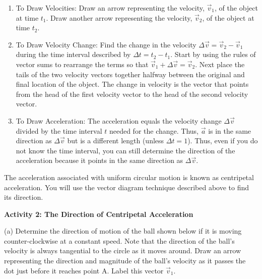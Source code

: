 \begin{enumerate}
\item To Draw Velocities: Draw an arrow representing the velocity, \( 
{\vec v}_{1} \), of
the object at time \( t_{1} \). Draw another arrow representing the velocity,
\( {\vec v}_{2} \), of the object at time \( t_{2} \). 
\item To Draw Velocity Change: Find the change in the velocity 
\( \Delta  {\vec v}
= {\vec v}_{2}  - {\vec v}_{1} \) during the time interval described
by \( \Delta  t = t_{2}  - t_{1} \). Start by using the rules of
vector sums to rearrange the terms so that \({\vec v}_{1}  +  \Delta  
{\vec v}
= {\vec v}_{2} \). Next place the tails of the two velocity vectors together
halfway between the original and final location of the object. The change in
velocity is the vector that points from the head of the first velocity vector
to the head of the second velocity vector. 
\item To Draw Acceleration: The acceleration equals the velocity change 
\( \Delta  {\vec v}\)
divided by the time interval $t$ needed for the change. Thus, $\vec a$ is in
the same direction as \( \Delta  {\vec v}\) but is a different length (unless
\( \Delta  t = 1\)). Thus, even if you do not know the time interval, you
can still determine the direction of the acceleration because it points in the
same direction as \( \Delta  {\vec v}\). 
\end{enumerate}
The acceleration associated with uniform circular motion is known as centripetal
acceleration. You will use the vector diagram technique described above to find
its direction. 

\textbf{Activity 2: The Direction of Centripetal Acceleration }

(a) Determine the direction of motion of the ball shown below if it is moving
counter-clockwise at a constant speed. Note that the direction of the ball's
velocity is always tangential to the circle as it moves around. Draw an arrow
representing the direction and magnitude of the ball's velocity as it passes
the dot just before it reaches point A. Label this vector \(\vec v _{1} \). 

